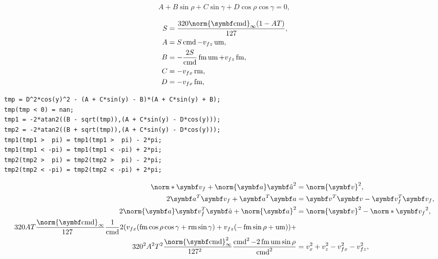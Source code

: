 \begin{align}
\label{eq:ABCD}
A + B\sin\rho + C\sin\gamma + D\cos\rho\cos\gamma = 0,
\end{align}

\begin{align*}
S &= \frac{320\norm{\vec{\cmd}}_{\infty}(1-AT)}{127},\\
A &= S\cmd         - v_{fz}\umove,\\
B &= -\frac{2S}{\cmd}\fmove\umove + v_{fz}\fmove,\\
C &= -v_{fx}\rmove,\\
D &= -v_{fx}\fmove,
\end{align*}

\begin{verbatim}
tmp = D^2*cos(y)^2 - (A + C*sin(y) - B)*(A + C*sin(y) + B);
tmp(tmp < 0) = nan;
tmp1 = -2*atan2((B - sqrt(tmp)),(A + C*sin(y) - D*cos(y)));
tmp2 = -2*atan2((B + sqrt(tmp)),(A + C*sin(y) - D*cos(y)));
tmp1(tmp1 >  pi) = tmp1(tmp1 >  pi) - 2*pi;
tmp1(tmp1 < -pi) = tmp1(tmp1 < -pi) + 2*pi;
tmp2(tmp2 >  pi) = tmp2(tmp2 >  pi) - 2*pi;
tmp2(tmp2 < -pi) = tmp2(tmp2 < -pi) + 2*pi;
\end{verbatim}

\begin{align*}
\norm*{\vec{v}_f + \norm{\vec{a}}\uvec{a}}^2 &= \norm{\vec{v}}^2,\\
2\vec{a}^T \vec{v}_f + \vec{a}^T \vec{a} &= \vec{v}^T \vec{v} - \vec{v}_f^T \vec{v}_f,\\
2\norm{\vec{a}} \vec{v}_f^T \uvec{a} + \norm{\vec{a}}^2 &= \norm{\vec{v}}^2 - \norm*{\vec{v}_f}^2,\\
320AT\frac{\norm{\vec{\cmd}}_{\infty}}{127\hphantom{_{\infty}}} \frac{1}{\cmd}2 (v_{fx}(\fmove \cos\rho\cos\gamma + \rmove \sin\gamma) + v_{fz}(-\fmove \sin\rho + \umove) ) +\\
320^2 A^2 T^2\frac{\norm{\vec{\cmd}}^2_{\infty}}{127^2\hphantom{_{\infty}}} \frac{\cmd^2  - 2\fmove\umove\sin\rho}{\cmd^2} &= v_x^2 + v_z^2 - v_{fx}^2 - v_{fz}^2,
\end{align*}

